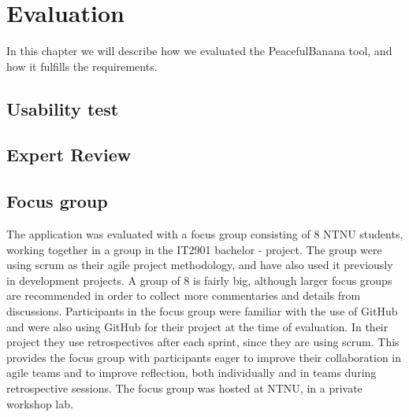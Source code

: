 \chapter{Evaluation}
In this chapter we will describe how we evaluated the PeacefulBanana tool, and how it fulfills the requirements.


\section{Usability test}

\section{Expert Review}


\section{Focus group}
The application was evaluated with a focus group consisting of 8 NTNU students, working together in a group in the IT2901 bachelor - project. The group were using scrum as their agile project methodology, and have also used it previously in development projects. A group of 8 is fairly big, although larger focus groups are recommended in order to collect more commentaries and details from discussions\citep{morgan1998planning}. Participants in the focus group were familiar with the use of GitHub and were also using GitHub for their project at the time of evaluation. In their project they use retrospectives after each sprint, since they are using scrum. This provides the focus group with participants eager to improve their collaboration in agile teams and to improve reflection, both individually and in teams during retrospective sessions. The focus group was hosted at NTNU, in a private workshop lab. 

